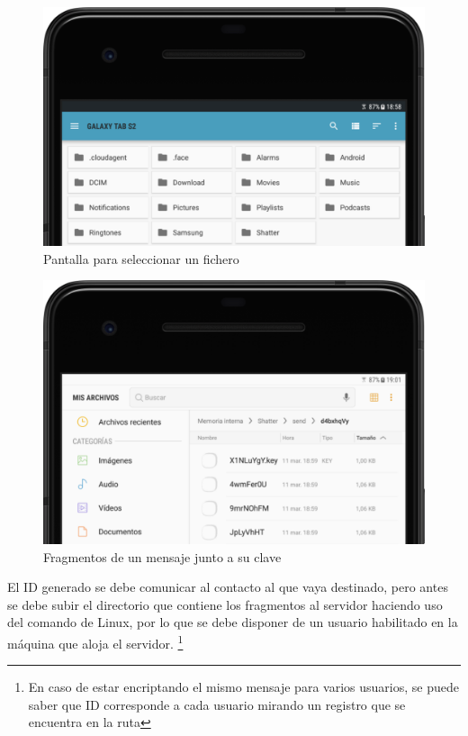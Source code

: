 \begin{figure}[!htb]
  \centering
  \includegraphics[scale=0.4]{Figures/file_picker}
  \decoRule
  \caption[Shatter (\emph{File Picker})]{Pantalla para seleccionar un fichero}
  \label{fig:file_picker}
\end{figure}

\begin{figure}[!htb]
  \centering
  \includegraphics[scale=0.4]{Figures/encfiles}
  \decoRule
  \caption[Shatter (Mensaje fragmentado)]{Fragmentos de un mensaje junto a su clave}
  \label{fig:encfiles}
\end{figure}

El ID generado se debe comunicar al contacto al que vaya destinado, pero antes se debe subir el directorio que contiene los fragmentos al servidor haciendo uso del comando  de Linux, por lo que se debe disponer de un usuario habilitado en la máquina que aloja el servidor. \footnote{En caso de estar encriptando el mismo mensaje para varios usuarios, se puede saber que ID corresponde a cada usuario mirando un registro que se encuentra en la ruta }

